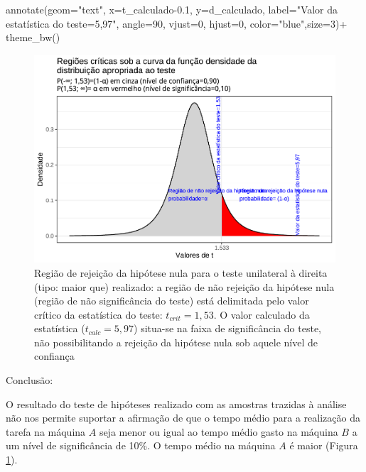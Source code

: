 \documentclass[
]{book}
\newenvironment{Shaded}{\begin{snugshade}}{\end{snugshade}}
\newcommand{\AttributeTok}[1]{\textcolor[rgb]{0.77,0.63,0.00}{#1}}
\newcommand{\DecValTok}[1]{\textcolor[rgb]{0.00,0.00,0.81}{#1}}
\newcommand{\FloatTok}[1]{\textcolor[rgb]{0.00,0.00,0.81}{#1}}
\newcommand{\FunctionTok}[1]{\textcolor[rgb]{0.00,0.00,0.00}{#1}}
\newcommand{\NormalTok}[1]{#1}
\newcommand{\SpecialCharTok}[1]{\textcolor[rgb]{0.00,0.00,0.00}{#1}}
\newcommand{\StringTok}[1]{\textcolor[rgb]{0.31,0.60,0.02}{#1}}
\begin{document}
\begin{Shaded}
\begin{Highlighting}[]
 \FunctionTok{annotate}\NormalTok{(}\AttributeTok{geom=}\StringTok{"text"}\NormalTok{, }\AttributeTok{x=}\NormalTok{t\_calculado}\FloatTok{{-}0.1}\NormalTok{, }\AttributeTok{y=}\NormalTok{d\_calculado, }\AttributeTok{label=}\StringTok{"Valor da estatística do teste=5,97"}\NormalTok{, }\AttributeTok{angle=}\DecValTok{90}\NormalTok{, }\AttributeTok{vjust=}\DecValTok{0}\NormalTok{, }\AttributeTok{hjust=}\DecValTok{0}\NormalTok{, }\AttributeTok{color=}\StringTok{"blue"}\NormalTok{,}\AttributeTok{size=}\DecValTok{3}\NormalTok{)}\SpecialCharTok{+}
  \FunctionTok{theme\_bw}\NormalTok{()}
\end{Highlighting}
\end{Shaded}

\begin{figure}

{\centering \includegraphics[width=1\linewidth]{apostila_files/figure-latex/fig99-1} 

}

\caption{Região de rejeição da hipótese nula para o teste unilateral à direita (tipo: maior que) realizado: a região de não rejeição da hipótese nula (região de não significância do teste) está delimitada pelo valor crítico da estatística do teste: $t_{crit} = 1,53$. O valor calculado da estatística ($t_{calc}=5,97$) situa-se na faixa de significância do teste, não possibilitando a rejeição da hipótese nula sob aquele nível de confiança}\label{fig:fig99}
\end{figure}

\hfill\break

Conclusão:

\hfill\break

O resultado do teste de hipóteses realizado com as amostras trazidas à análise não nos permite suportar a afirmação de que o tempo médio para a realização da tarefa na máquina \(A\) seja menor ou igual ao tempo médio gasto na máquina \(B\) a um nível de significância de 10\%. O tempo médio na máquina \(A\) é maior (Figura \ref{fig:fig99}).
\end{document}
